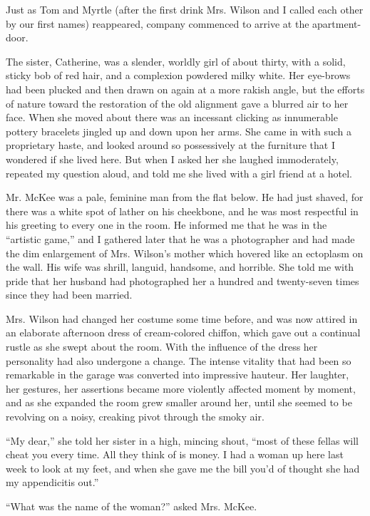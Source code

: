 \documentclass{znotebook}
\begin{document}
Just as Tom and Myrtle (after the first drink Mrs. Wilson and I called each other by our first names) reappeared, company commenced to arrive at the apartment-door.

The sister, Catherine, was a slender, worldly girl of about thirty, with a solid, sticky bob of red hair, and a complexion powdered milky white. Her eye-brows had been plucked and then drawn on again at a more rakish angle, but the efforts of nature toward the restoration of the old alignment gave a blurred air to her face. When she moved about there was an incessant clicking as innumerable pottery bracelets jingled up and down upon her arms. She came in with such a proprietary haste, and looked around so possessively at the furniture that I wondered if she lived here. But when I asked her she laughed immoderately, repeated my question aloud, and told me she lived with a girl friend at a hotel.

Mr. McKee was a pale, feminine man from the flat below. He had just shaved, for there was a white spot of lather on his cheekbone, and he was most respectful in his greeting to every one in the room. He informed me that he was in the ``artistic game,'' and I gathered later that he was a photographer and had made the dim enlargement of Mrs. Wilson's mother which hovered like an ectoplasm on the wall. His wife was shrill, languid, handsome, and horrible. She told me with pride that her husband had photographed her a hundred and twenty-seven times since they had been married.

Mrs. Wilson had changed her costume some time before, and was now attired in an elaborate afternoon dress of cream-colored chiffon, which gave out a continual rustle as she swept about the room. With the influence of the dress her personality had also undergone a change. The intense vitality that had been so remarkable in the garage was converted into impressive hauteur. Her laughter, her gestures, her assertions became more violently affected moment by moment, and as she expanded the room grew smaller around her, until she seemed to be revolving on a noisy, creaking pivot through the smoky air.

``My dear,'' she told her sister in a high, mincing shout, ``most of these fellas will cheat you every time. All they think of is money. I had a woman up here last week to look at my feet, and when she gave me the bill you'd of thought she had my appendicitis out.''

``What was the name of the woman?'' asked Mrs. McKee.
\end{document}
